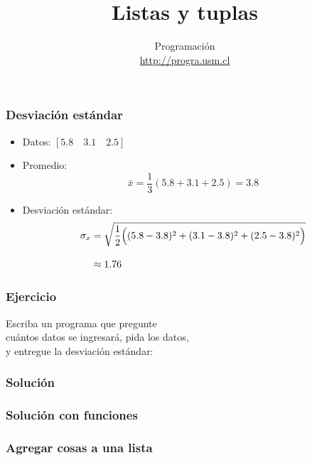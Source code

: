 \documentclass[12pt]{beamer}
\title{Listas y tuplas}
\author{
  Programación \\ \url{http://progra.usm.cl}
}
\date{}
\begin{document}
  \begin{frame}
    \maketitle
  \end{frame}

  \begin{frame}
    \frametitle{Desviación estándar}
    \label{def-desviacion}
    \begin{itemize}
      \item Datos: \([5.8\quad 3.1\quad 2.5]\)
      \item Promedio:
        \[
          \bar{x} =
          \frac{1}{3}
          (5.8 + 3.1 + 2.5) = 3.8
        \]
      \item Desviación estándar:
        \begin{align*}
          \sigma_x &=
          \sqrt{
            \frac{1}{2}
            \Bigl(
              (5.8 - 3.8)^2 +
              (3.1 - 3.8)^2 +
              (2.5 - 3.8)^2
            \Bigr)
          } \\[2ex]
          &\approx 1.76
        \end{align*}
    \end{itemize}

  \end{frame}

  \begin{frame}
    \label{ejercicio-desviacion}
    \frametitle{Ejercicio}
    Escriba un programa que pregunte \\
    cuántos datos se ingresará, pida los datos, \\
    y entregue la desviación estándar:
    
  \end{frame}

  \begin{frame}
    \label{programa-desviacion}
    \frametitle{Solución}
    \footnotesize
    
  \end{frame}

  \begin{frame}
    \label{programa-desviacion-funciones}
    \frametitle{Solución con funciones}
    \tiny
    
  \end{frame}

  \begin{frame}
    \label{listas-agregar}
    \frametitle{Agregar cosas a una lista}
    
  \end{frame}
\end{document}
